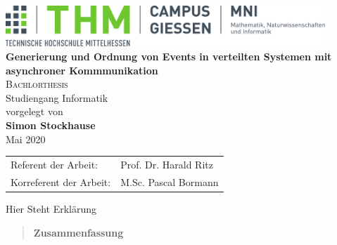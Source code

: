 \documentclass[%
	BCOR=8.25mm,         %
	DIV=12,              %
	parskip=half,				 %
	bibliography=totoc,	 %
	headsepline=on,      %
	openany,
	ngerman
	]{scrbook}
\begin{document}
\frontmatter

\begin{titlepage}
	\begin{center}
	\includegraphics[width=0.9\textwidth]{img/mni-logo}\\[5cm]
	\textbf{\huge\sffamily Generierung und Ordnung von Events in verteilten Systemen mit asynchroner Kommmunikation}\\[2cm]
	\textsc{\Large Bachlorthesis}\\Studiengang Informatik\\[2cm]
	vorgelegt von\\
	\textbf{Simon Stockhause}\\ [1.5cm] 
	Mai 2020
	\end{center}
	\vfill
	\center
	\begin{tabular}{ll}
		Referent der Arbeit: & Prof. Dr. Harald Ritz\\ 
		Korreferent der Arbeit: & M.Sc. Pascal Bormann\\ 
	\end{tabular}
\end{titlepage}
\cleardoubleemptypage

\pagestyle{empty}
{
	\renewcommand{\thispagestyle}[1]{}
 Hier Steht Erklärung
}
\clearpage
\pagestyle{plain}

\pagestyle{empty}
\begin{quote}
	\vspace*{4cm}

	\begin{center}
		\textbf{\Large\sffamily Zusammenfassung}
	\end{center}
\end{quote}
\cleardoubleemptypage


\pagestyle{empty}
{
	\renewcommand{\thispagestyle}[1]{}
	\tableofcontents
}
\clearpage
\pagestyle{plain}
\pagestyle{empty}
{
	\renewcommand{\thispagestyle}[1]{}
	\listoffigures
}
\clearpage
\pagestyle{plain}

\mainmatter 
\pagestyle{headings}








\backmatter 

\appendix

\end{document}
